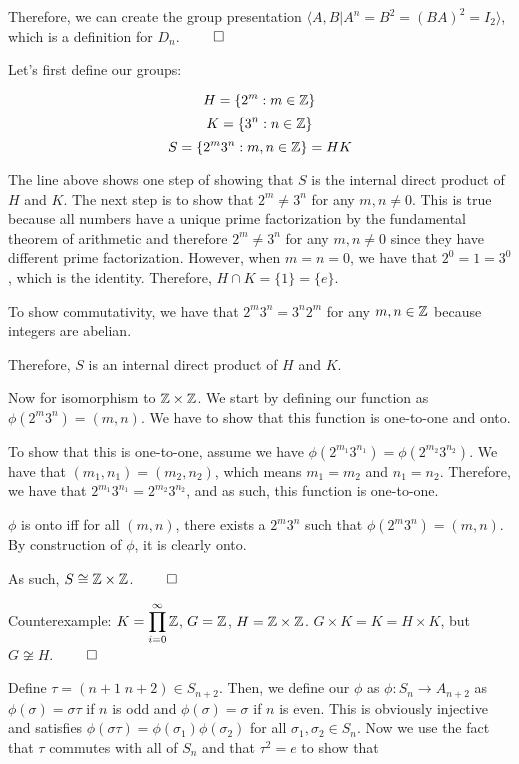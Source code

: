 \documentclass[12pt]{report}
\begin{document}
Therefore, we can create the group presentation $ \langle A, B | A^n = B^2 = (BA)^2= I_2 \rangle$, which is a definition for $D_n$. $\qed$ 

\sol Let's first define our groups:

$$H = \{2^m : m \in \ZZ\}$$
$$K = \{3^n : n \in \ZZ\}$$
$$S = \{2^m3^n : m, n \in \ZZ\} = HK$$

The line above shows one step of showing that $S$ is the internal direct product of $H$ and $K$. The next step is to show that $2^m \neq 3^n$ for any $m, n \neq 0$. This is true because all numbers have a unique prime factorization by the fundamental theorem of arithmetic and therefore $2^m \neq 3^n$ for any $m, n \neq 0$ since they have different prime factorization. However, when $m = n = 0$, we have that $2^0 = 1 = 3^0$, which is the identity. Therefore, $H \cap K = \{1\} = \{e\}$.

To show commutativity, we have that $2^m3^n = 3^n2^m$ for any $m, n \in \ZZ$ because integers are abelian. 

Therefore, $S$ is an internal direct product of $H$ and $K$.

Now for isomorphism to $\ZZ \times \ZZ$. We start by defining our function as $\phi(2^m3^n) = (m, n)$. We have to show that this function is one-to-one and onto. 

To show that this is one-to-one, assume we have $\phi(2^{m_1}3^{n_1}) = \phi(2^{m_2}3^{n_2})$. We have that $(m_1, n_1) = (m_2, n_2)$, which means $m_1 = m_2$ and $n_1 = n_2$. Therefore, we have that $2^{m_1}3^{n_1} = 2^{m_2}3^{n_2}$, and as such, this function is one-to-one.

$\phi$ is onto iff for all $(m, n)$, there exists a $2^m3^n$ such that $\phi(2^m3^n) = (m, n)$. By construction of $\phi$, it is clearly onto. 

As such, $S \cong \ZZ \times \ZZ$. $\qed$

\sol Counterexample: $K = \displaystyle \prod_{i=0}^\infty \ZZ$, $G = \ZZ$, $H = \ZZ \times \ZZ$. $G \times K = K = H \times K$, but $G \not\cong H$. $\qed$

\sol Define $\tau = (n+1 \; n+2) \in S_{n+2}$. Then, we define our $\phi$ as $\phi : S_n \to A_{n+2}$ as $\phi(\sigma) = \sigma \tau$ if $n$ is odd and $\phi(\sigma) = \sigma$ if $n$ is even. This is obviously injective and satisfies $\phi(\sigma\tau) = \phi(\sigma_1)\phi(\sigma_2)$ for all $\sigma_1, \sigma_2 \in S_n$. Now we use the fact that $\tau$ commutes with all of $S_n$ and that $\tau^2 = e$ to show that 
\end{document}
